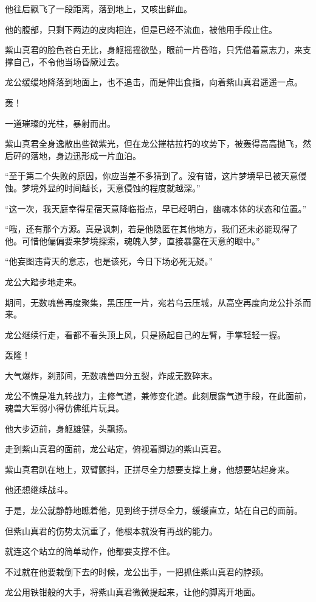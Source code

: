 \begin{this_body}
他往后飘飞了一段距离，落到地上，又咳出鲜血。

他的腹部，只剩下两边的皮肉相连，但是已经不流血，被他用手段止住。

紫山真君的脸色苍白无比，身躯摇摇欲坠，眼前一片昏暗，只凭借着意志力，来支撑自己，不令他当场昏厥过去。

龙公缓缓地降落到地面上，也不追击，而是伸出食指，向着紫山真君遥遥一点。

轰！

一道璀璨的光柱，暴射而出。

紫山真君全身逸散出些微紫光，但在龙公摧枯拉朽的攻势下，被轰得高高抛飞，然后砰的落地，身边迅形成一片血泊。

“至于第二个失败的原因，你应当差不多猜到了。没有错，这片梦境早已被天意侵蚀。梦境外显的时间越长，天意侵蚀的程度就越深。”

“这一次，我天庭幸得星宿天意降临指点，早已经明白，幽魂本体的状态和位置。”

“哦，还有那个方源。真是讽刺，若是他隐匿在其他地方，我们还未必能现得了他。可惜他偏偏要来梦境探索，魂魄入梦，直接暴露在天意的眼中。”

“他妄图违背天的意志，也是该死，今日下场必死无疑。”

龙公大踏步地走来。

期间，无数魂兽再度聚集，黑压压一片，宛若乌云压城，从高空再度向龙公扑杀而来。

龙公继续行走，看都不看头顶上风，只是扬起自己的左臂，手掌轻轻一握。

轰隆！

大气爆炸，刹那间，无数魂兽四分五裂，炸成无数碎末。

龙公不愧是准九转战力，主修气道，兼修变化道。此刻展露气道手段，在此面前，魂兽大军弱小得仿佛纸片玩具。

他大步迈前，身躯雄健，头飘扬。

走到紫山真君的面前，龙公站定，俯视着脚边的紫山真君。

紫山真君趴在地上，双臂颤抖，正拼尽全力想要支撑上身，他想要站起身来。

他还想继续战斗。

于是，龙公就静静地瞧着他，见到终于拼尽全力，缓缓直立，站在自己的面前。

但紫山真君的伤势太沉重了，他根本就没有再战的能力。

就连这个站立的简单动作，他都要支撑不住。

不过就在他要栽倒下去的时候，龙公出手，一把抓住紫山真君的脖颈。

龙公用铁钳般的大手，将紫山真君微微提起来，让他的脚离开地面。


\end{this_body}
